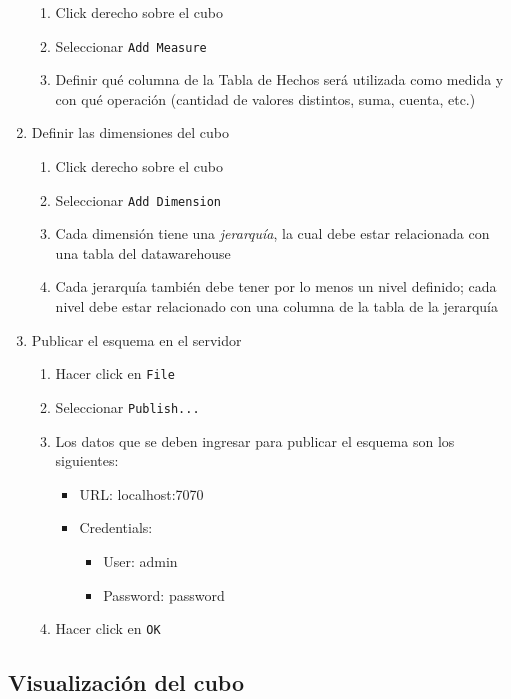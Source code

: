 \begin{enumerate}
    \begin{enumerate}
        \item Click derecho sobre el cubo
        \item Seleccionar \texttt{Add Measure}
        \item Definir qué columna de la Tabla de Hechos será utilizada como medida y con qué operación (cantidad de valores distintos, suma, cuenta, etc.)
    \end{enumerate}
    \item Definir las dimensiones del cubo
    \begin{enumerate}
        \item Click derecho sobre el cubo
        \item Seleccionar \texttt{Add Dimension}
        \item Cada dimensión tiene una \emph{jerarquía}, la cual debe estar relacionada con una tabla del datawarehouse 
        \item Cada jerarquía también debe tener por lo menos un nivel definido; cada nivel debe estar relacionado con una columna de la tabla de la jerarquía
    \end{enumerate}
    \item Publicar el esquema en el servidor
    \begin{enumerate}
        \item Hacer click en \texttt{File}
        \item Seleccionar \texttt{Publish...}
        \item Los datos que se deben ingresar para publicar el esquema son los siguientes:
        \begin{itemize}
            \item URL: localhost:7070
            \item Credentials:
                \begin{itemize}
                    \item User: admin
                    \item Password: password
                \end{itemize}
        \end{itemize}
        \item Hacer click en \texttt{OK}
    \end{enumerate}
\end{enumerate}

\subsection{Visualización del cubo}

